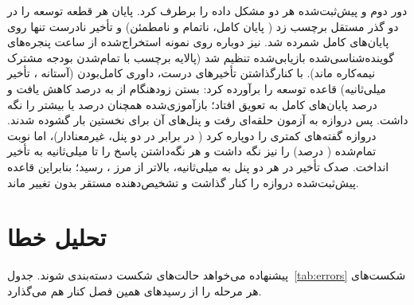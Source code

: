 دور دوم و پیش‌ثبت‌شده هر دو مشکل داده را برطرف کرد. پایان هر قطعه توسعه را
 در دو گذر مستقل برچسب زد ( پایان کامل،  ناتمام و
 نامطمئن) و تأخیر نادرست تنها روی پایان‌های کامل شمرده شد. 
نیز دوباره روی  نمونه استخراج‌شده از  ساعت پنجره‌های گوینده‌شناسی‌شده
بازیابی‌شده تنظیم شد (پالایه برچسب با تمام‌شدن بودجه مشترک  نیمه‌کاره ماند).
با کنارگذاشتن تأخیرهای درست، داوری کامل‌بودن  (آستانه ، تأخیر
 میلی‌ثانیه) قاعده توسعه را برآورده کرد: بستن زودهنگام از  به 
درصد کاهش یافت و  درصد پایان‌های کامل به تعویق افتاد؛ 
بازآموزی‌شده همچنان  درصد یا بیشتر را نگه داشت. پس دروازه به آزمون حلقه‌ای
رفت و پنل‌های آن برای نخستین بار گشوده شدند. دروازه گفته‌های کمتری را دوپاره کرد
( در برابر  در دو پنل، غیرمعنادار)، اما  نوبت تمام‌شده
( درصد) را نیز نگه داشت و هر نگه‌داشتن پاسخ را تا  میلی‌ثانیه
به تأخیر انداخت. صدک  تأخیر در هر دو پنل به  میلی‌ثانیه، بالاتر از
مرز ، رسید؛ بنابراین قاعده پیش‌ثبت‌شده دروازه را کنار گذاشت و
تشخیص‌دهنده مستقر بدون تغییر ماند.


\section{تحلیل خطا}
\label{sec:res-errors}

پیشنهاده می‌خواهد حالت‌های شکست دسته‌بندی شوند. جدول~\ref{tab:errors} شکست‌های
هر مرحله را از رسیدهای همین فصل کنار هم می‌گذارد.

